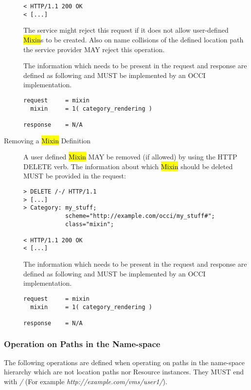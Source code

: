 \documentclass[10pt,a4paper]{article}
\begin{document}
\begin{description}
\begin{verbatim}
< HTTP/1.1 200 OK
< [...]
\end{verbatim}
    The service might reject this request if it does not allow
    user-defined \hl{Mixin}s to be created. Also on name collisions of
    the defined location path the service provider MAY reject this
    operation.

    The information which needs to be present in the request and
    response are defined as following and MUST be implemented by an
    OCCI implementation.

\begin{verbatim}
request     = mixin
  mixin     = 1( category_rendering )

response    = N/A
\end{verbatim}

  \item[Removing a \hl{Mixin} Definition] A user defined \hl{Mixin}
    MAY be removed (if allowed) by using the HTTP DELETE verb. The
    information about which \hl{Mixin} should be deleted MUST be
    provided in the request:
\begin{verbatim}
> DELETE /-/ HTTP/1.1
> [...]
> Category: my_stuff; 
            scheme="http://example.com/occi/my_stuff#"; 
            class="mixin";

< HTTP/1.1 200 OK
< [...]
\end{verbatim}

    The information which needs to be present in the request and
    response are defined as following and MUST be implemented by an
    OCCI implementation.

\begin{verbatim}
request     = mixin
  mixin     = 1( category_rendering )

response    = N/A
\end{verbatim}

\end{description}

%
%

\subsubsection{Operation on Paths in the Name-space}
The following operations are defined when operating on paths in the
name-space hierarchy which are not location paths nor Resource
instances. They MUST end with \emph{/} (For example
\emph{http://example.com/vms/user1/}).
\end{document}
